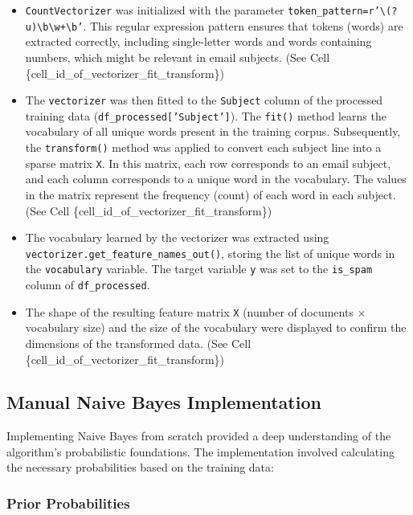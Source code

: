 \documentclass[12pt,letterpaper]{article}
\begin{document}
\begin{itemize}
    \item \texttt{CountVectorizer} was initialized with the parameter \texttt{token\_pattern=r'\textbackslash(?u)\textbackslash b\textbackslash w+\textbackslash b'}. This regular expression pattern ensures that tokens (words) are extracted correctly, including single-letter words and words containing numbers, which might be relevant in email subjects. (See Cell \{cell\_id\_of\_vectorizer\_fit\_transform\})
    
    \item The \texttt{vectorizer} was then fitted to the \texttt{Subject} column of the processed training data (\texttt{df\_processed['Subject']}). The \texttt{fit()} method learns the vocabulary of all unique words present in the training corpus. Subsequently, the \texttt{transform()} method was applied to convert each subject line into a sparse matrix \texttt{X}. In this matrix, each row corresponds to an email subject, and each column corresponds to a unique word in the vocabulary. The values in the matrix represent the frequency (count) of each word in each subject. (See Cell \{cell\_id\_of\_vectorizer\_fit\_transform\})
    
    \item The vocabulary learned by the vectorizer was extracted using \texttt{vectorizer.get\_feature\_names\_out()}, storing the list of unique words in the \texttt{vocabulary} variable. The target variable \texttt{y} was set to the \texttt{is\_spam} column of \texttt{df\_processed}.
    
    \item The shape of the resulting feature matrix \texttt{X} (number of documents $\times$ vocabulary size) and the size of the vocabulary were displayed to confirm the dimensions of the transformed data. (See Cell \{cell\_id\_of\_vectorizer\_fit\_transform\})
\end{itemize}

\subsection{Manual Naive Bayes Implementation}

Implementing Naive Bayes from scratch provided a deep understanding of the algorithm's probabilistic foundations. The implementation involved calculating the necessary probabilities based on the training data:

\subsubsection{Prior Probabilities}
\end{document}
